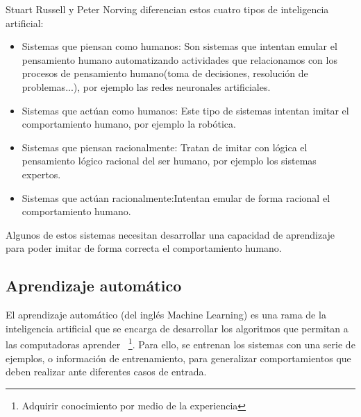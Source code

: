 Stuart Russell y Peter Norving\cite{wiki:tiposInteligenciaArtificial}  diferencian estos cuatro tipos de inteligencia artificial:

\begin{itemize}
	\item{Sistemas que piensan como humanos}: Son sistemas que intentan emular el pensamiento humano automatizando actividades que relacionamos con los procesos de pensamiento humano(toma de decisiones, resolución de problemas...), por ejemplo las redes neuronales artificiales.
	\item{Sistemas que actúan como humanos}: Este tipo de sistemas intentan imitar el comportamiento humano, por ejemplo la robótica.
	\item{Sistemas que piensan racionalmente}: Tratan de imitar con lógica el pensamiento lógico racional del ser humano, por ejemplo los sistemas expertos.
	\item{Sistemas que actúan racionalmente}:Intentan emular de forma racional el comportamiento humano.
\end{itemize}

Algunos de estos sistemas necesitan desarrollar una capacidad de aprendizaje para poder imitar de forma correcta el comportamiento humano.

\subsection{Aprendizaje automático}

El aprendizaje automático (del inglés Machine Learning) es una rama de la inteligencia artificial que se encarga de desarrollar los algoritmos que permitan a las computadoras aprender ~\footnote{Adquirir conocimiento por medio de la experiencia}. Para ello, se entrenan los sistemas con una serie de ejemplos, o información de entrenamiento, para generalizar comportamientos que deben realizar ante diferentes casos de entrada.

